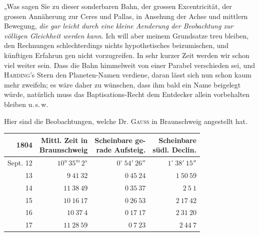 „Was sagen Sie zu dieser sonderbaren Bahn, der grossen Excentricität, der grossen
Annäherung zur Ceres und Pallas, in Ansehung der Achse und mittlern Bewegung,
\textit{die gar leicht durch eine kleine Aenderung der Beobachtung zur völligen
Gleichheit werden kann}. Ich will aber meinem Grundsatze treu bleiben, den Rechnungen
schlechterdings nichts hypothetisches beizumischen, und künftigen Erfahrun%
%
gen nicht vorzugreifen. In sehr kurzer Zeit werden wir schon viel weiter sein. Dass die
Bahn himmelweit von einer Parabel verschieden sei, und \textsc{Harding}'s Stern den
Planeten-Namen verdiene, daran lässt sich nun schon kaum mehr zweifeln; es wäre
daher zu wünschen, dass ihm bald ein Name beigelegt würde, natürlich muss das
Baptisations-Recht dem Entdecker allein vorbehalten bleiben u.\,s.\,w.

Hier sind die Beobachtungen, welche Dr. \textsc{Gauss} in Braunschweig angestellt hat.

\begin{center}
\begingroup\fontsize{9}{11}\selectfont\setlength{\tabcolsep}{3pt}\renewcommand{\arraystretch}{1.12}
\begin{tabular}{r|r|r|r}
1804 & \shortstack{Mittl. Zeit in\\Braunschweig} & \shortstack{Scheinbare ge-\\rade Aufsteig.} & \shortstack{Scheinbare\\südl. Declin.} \\ \hline
Sept. 12 & $10^{u}\,35^{m}\,2^{s}$ & $0^\circ\ 54'\ 26''$ & $1^\circ\ 38'\ 15''$ \\
13 & $9\ 41\ 32$ & $0\ 45\ 24$ & $1\ 50\ 59$ \\
14 & $11\ 38\ 49$ & $0\ 35\ 37$ & $2\ 5\ 1$ \\
15 & $10\ 16\ 17$ & $0\ 26\ 53$ & $2\ 17\ 42$ \\
16 & $10\ 37\ 4$ & $0\ 17\ 17$ & $2\ 31\ 20$ \\
17 & $11\ 28\ 59$ & $0\ 7\ 23$ & $2\ 44\ 7$ \\
\end{tabular}\endgroup
\end{center}

